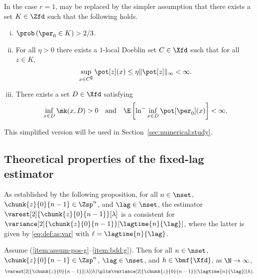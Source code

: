 \begin{remark} \label{rem:simplified:assumptions}
    In the case $r = 1$,  may be replaced by the simpler assumption
    that there exists a set $K \in \Zfd$ such that the following holds.
    \begin{enumerate}[(i)]
        \item \label{item:condition-L-K-simplified}
        $\prob \left( \per_0 \in K \right) > 2 / 3$.
        \item \label{item:condition:local:doeblin:simplified}
        For all $\eta > 0$ there exists a $1$-local Doeblin set $C \in \Xfd$ such that for all $z \in K$,
        \begin{equation}
            \label{eq:bound-eta-G-simplified}
            \sup_{x \in C^\complement} \pot[z](x) \leq \eta \| \pot[z] \|_\infty < \infty.
        \end{equation}
        \item \label{item:mino-g-simple} There exists a set $D \in \Xfd$ satisfying
        $$
            \inf_{x \in D} \mk(x, D) > 0 \quad \mbox{and} \quad \E \left[ \ln^- \inf_{x \in D} \pot[\per_0](x) \right] < \infty.
        $$
    \end{enumerate}
    This simplified version will be used in Section~\ref{sec:numerical:study}.
\end{remark}

\subsection{Theoretical properties of the fixed-lag estimator}

As established by the following proposition, for all $n \in \nset$, $\chunk{z}{0}{n - 1} \in \Zsp^n$, and $\lag \in \nset$, the estimator $\varest[2]{\chunk{z}{0}{n - 1}}[\lambda]$ is a consistent for $\variance[2]{\chunk{z}{0}{n - 1}}[\lagtime{n}{\lag}]$, where the latter is given by \eqref{eq:def:as:var} with $\ell = \lagtime{n}{\lag}$. 

\begin{proposition} \label{prop:consistency:fixed:lag}
Assume (\ref{item:assum-pos-g}--\ref{item:bdd:g}). Then for all $n \in \nset$, $\chunk{z}{0}{n - 1} \in \Zsp^n$, $\lag \in \nset$, and $h \in \bmf{\Xfd}$, as $\N \rightarrow \infty$, 
$$
\varest[2]{\chunk{z}{0}{n - 1}}[\lambda](h) \plim \variance[2]{\chunk{z}{0}{n - 1}}[\lagtime{n}{\lag}](h). 
$$
\end{proposition}

